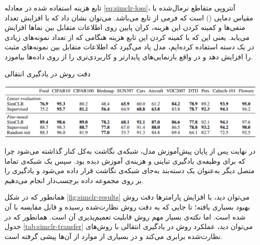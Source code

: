 تابع هزینه استفاده شده در معادله \ref{eq:simclr-loss}،
آنتروپی متقاطع نرمال‌شده با مقیاس دمایی
() است که فرمی از تابع 
می‌باشد. می‌توان نشان داد که با افزایش تعداد منفی‌ها و کمینه کردن این هزینه، کران پایین روی
اطلاعات متقابل
بین نماها افزایش می‌یابد. یعنی این که با کمینه کردن این تابع هزینه هنگامی که از تعداد نمونه‌های زیادی در یک دسته استفاده کرده‌ایم، مدل یاد می‌گیرد که اطلاعات متقابل بین نمونه‌های مثبت را افزایش دهد و در واقع بازنمایی‌های پایدارتر و کاربردی‌تری را از روی داده‌ها بیاموزد.
\begin{table}[t]
\centering
\caption{دقت روش  در یادگیری انتقالی}
\includegraphics[width=1\textwidth]{Images/Chapter2/simclr-transfer.png}
\label{tab:simclr-transfer}
\end{table}
در نهایت پس از پایان پیش‌آموزش مدل، شبکه‌ی نگاشت به‌کل کنار گذاشته می‌شود چرا که برای وظیفه‌ی یادگیری تباینی و هزینه‌ی 
آموزش دیده بود. سپس یک شبکه‌ی تماما متصل دیگر به‌عنوان یک دسته‌بند به‌جای شبکه‌ی نگاشت قرار داده می‌شود و یادگیری را بر روی مجموعه داده برچسب‌دار انجام می‌دهیم.

همانطور که در شکل \ref{fig:simclr-results}
می‌توان دید، با افزایش پارامترها دقت روش 
بهبود بسیاری یافته؛ تا جایی که به دقت روش نظارت‌شده رسیده و قابل مقایسه با آن شده است. اما نکته‌ی بسیار مهم روش 
قابلیت تعمیم‌پذیری آن است. همانطور که در جدول \ref{tab:simclr-transfer}
می‌توان دید، عملکرد روش 
در یادگیری انتقالی با روش‌های نظارت‌شده برابری می‌کند و در بسیاری از موارد از آن‌ها پیشی گرفته است.

